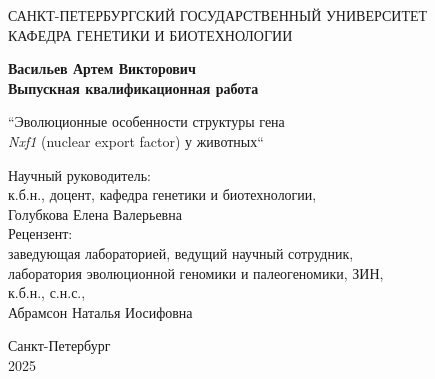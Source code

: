 \newpage
\begin{titlepage}

\begin{center}
    САНКТ-ПЕТЕРБУРГСКИЙ ГОСУДАРСТВЕННЫЙ УНИВЕРСИТЕТ \\КАФЕДРА ГЕНЕТИКИ И БИОТЕХНОЛОГИИ
    \vspace{5cm}

    \textbf{Васильев Артем Викторович \\Выпускная квалификационная работа}
    \vspace{1cm}

    ``Эволюционные особенности структуры гена \\\textit{Nxf1} (nuclear export factor) у животных``
\end{center}

\vfill

\begin{flushright}
    Научный руководитель: \\к.б.н., доцент, кафедра генетики и биотехнологии, \\Голубкова Елена Валерьевна \\
    \vspace{1cm}
    Рецензент: \\заведующая лабораторией, ведущий научный сотрудник, \\лаборатория эволюционной геномики и палеогеномики, ЗИН, \\к.б.н., с.н.с., \\Абрамсон Наталья Иосифовна
\end{flushright}

\vfill

\begin{center}
    Санкт-Петербург \\2025
\end{center}

\end{titlepage}

\setcounter{page}{2} %
